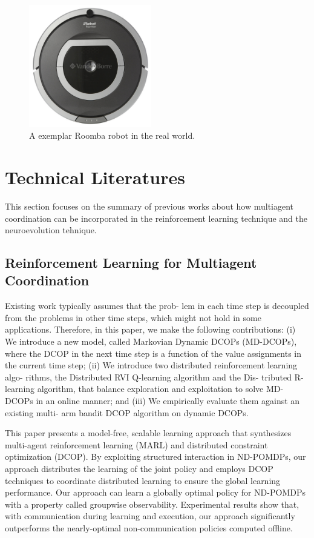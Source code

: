 \documentclass[conference]{IEEEtran}
\begin{document}
\begin{figure}[!t]
\centering
\includegraphics[width=2.1in,height=2.1in]{./figures/irobot_roomba.jpg}
\caption{A exemplar Roomba robot in the real world.}
\label{roomba:world}
\end{figure}


\section{Technical Literatures} \label{section:literature}
This section focuses on the summary of previous works about how multiagent
coordination can be incorporated in the reinforcement learning technique and the
neuroevolution tehnique.
\subsection{Reinforcement Learning for Multiagent Coordination}
\cite{nguyen2014decentralized} Existing work typically assumes that the prob- lem in each time step is decoupled from the problems in other time steps, which might not hold in some applications. Therefore, in this paper, we make the following contributions: (i) We introduce a new model, called Markovian Dynamic DCOPs (MD-DCOPs), where the DCOP in the next time step is a function of the value assignments in the current time step; (ii) We introduce two distributed reinforcement learning algo- rithms, the Distributed RVI Q-learning algorithm and the Dis- tributed R-learning algorithm, that balance exploration and exploitation to solve MD-DCOPs in an online manner; and (iii) We empirically evaluate them against an existing multi- arm bandit DCOP algorithm on dynamic DCOPs.

\cite{zhang2011coordinated} This paper presents a
model-free, scalable learning approach that synthesizes
multi-agent reinforcement learning (MARL) and distributed
constraint optimization (DCOP). By exploiting
structured interaction in ND-POMDPs, our approach
distributes the learning of the joint policy and employs
DCOP techniques to coordinate distributed learning to
ensure the global learning performance. Our approach
can learn a globally optimal policy for ND-POMDPs
with a property called groupwise observability. Experimental
results show that, with communication during
learning and execution, our approach significantly outperforms
the nearly-optimal non-communication policies
computed offline.
\end{document}
